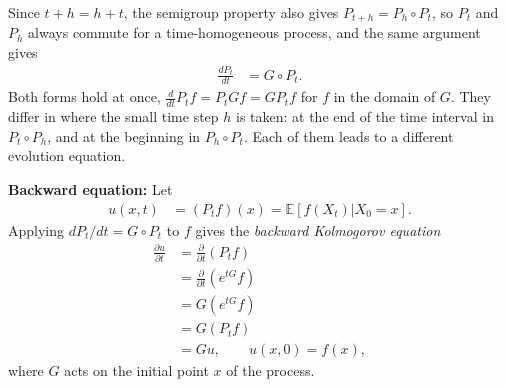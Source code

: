 \documentclass[11pt]{article}
\begin{document}
Since $t+h=h+t$, the semigroup property also gives $P_{t+h}=P_h\circ P_t$, so $P_t$ and $P_h$ always commute for a time-homogeneous process, and the same argument gives
\begin{align}
  \frac{dP_t}{dt}&=G\circ P_t.
\end{align}
Both forms hold at once, $\frac{d}{dt}P_tf=P_tGf=GP_tf$ for $f$ in the domain of $G$. They differ in where the small time step $h$ is taken: at the end of the time interval in $P_t\circ P_h$, and at the beginning in $P_h\circ P_t$. Each of them leads to a different evolution equation.

{\bf Backward equation:} Let
\begin{align}
  u(x,t)&=(P_tf)(x)=\mathbb{E}[f(X_t)|X_0=x].
\end{align}
Applying $dP_t/dt=G\circ P_t$ to $f$ gives the {\it backward Kolmogorov equation}
\begin{align}
  \frac{\partial u}{\partial t}&=\frac{\partial}{\partial t}\left(P_tf\right)\nonumber\\
  &=\frac{\partial}{\partial t}\left(e^{tG}f\right)\nonumber\\
  &=G\left(e^{tG}f\right)\nonumber\\
  &=G\left(P_tf\right)\nonumber\\
  &=Gu,\qquad u(x,0)=f(x),
\end{align}
where $G$ acts on the initial point $x$ of the process.
\end{document}

